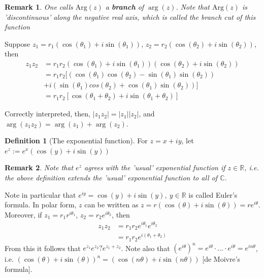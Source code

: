 \documentclass[12pt, a4paper]{article}
\theoremstyle{plain}
\newtheorem{rem}{Remark}
\theoremstyle{definition}
\newtheorem{definition}{Definition} %
\begin{document}
				\begin{rem}
					One calls $\mathrm{Arg}(z)$ a \textbf{branch} of $\arg(z)$. Note that $\mathrm{Arg}(z)$ is 'discontinuous' along the negative real axis, which is called the branch cut of this function\\
				\end{rem}

				Suppose $z_1 = r_1(\cos(\theta_1)+i\sin(\theta_1))$, $z_2 = r_2(\cos(\theta_2)+i\sin(\theta_2))$, then
				\begin{align*}
					z_1z_2 &= r_1r_2(\cos(\theta_1)+i\sin(\theta_1))(\cos(\theta_2)+i\sin(\theta_2))\\
					&= r_1r_2[(\cos(\theta_1)\cos(\theta_2)-\sin(\theta_1)\sin(\theta_2))\\\quad&+i(\sin(\theta_1)cos(\theta_2)+\cos(\theta_1)\sin(\theta_2))]\\
					&= r_1r_2[\cos(\theta_1+\theta_2)+i\sin(\theta_1+\theta_2)]
				\end{align*}

				Correctly interpreted, then, $|z_1z_2| = |z_1||z_2|$, and $\arg(z_1z_2) = \arg(z_1)+\arg(z_2)$.

				\begin{definition}[The exponential function]
					For $z=x+iy$, let $e^z:=e^x(\cos(y)+i\sin(y))$\\
				\end{definition}

				\begin{rem}
					Note that $e^z$ agrees with the 'usual' exponential function if $z\in\mathbb{R}$, i.e. the above definition extends the 'usual' exponential function to all of $\mathbb{C}$.
				\end{rem}

				Note in particular that $e^{iy}=\cos(y)+i\sin(y),\:y\in\mathbb{R}$ is called Euler's formula. In polar form, $z$ can be written as $z= r(\cos(\theta)+i\sin(\theta)) = re^{i\theta}$. Moreover, if $z_1=r_1r^{i\theta_1}$, $z_2=r_2e^{i\theta_2}$, then 
				\begin{align*}
					z_1z_2 &= r_1r_2e^{i\theta_1}e^{i\theta_2}\\
					&= r_1r_2e^{i(\theta_1+\theta_2)}
				\end{align*}
				From this it follows that $e^{z_1}e^{z_2}?e^{z_1+z_2}$. Note also that $(e^{i\theta})^n = e^{i\theta}\cdot\ldots\cdot e^{i\theta} = e^{in\theta}$, i.e. $(\cos(\theta)+i\sin(\theta))^n = (\cos(n\theta)+i\sin(n\theta))$ [de Moivre's formula].
\end{document}
